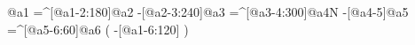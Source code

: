                    @{a1}%
    =^[@{a1-2}:180]@{a2}%
     -[@{a2-3}:240]@{a3}%
    =^[@{a3-4}:300]@{a4}N%
         -[@{a4-5}]@{a5}%
     =^[@{a5-6}:60]@{a6}%
                      (
         -[@{a1-6}:120]%
                      )